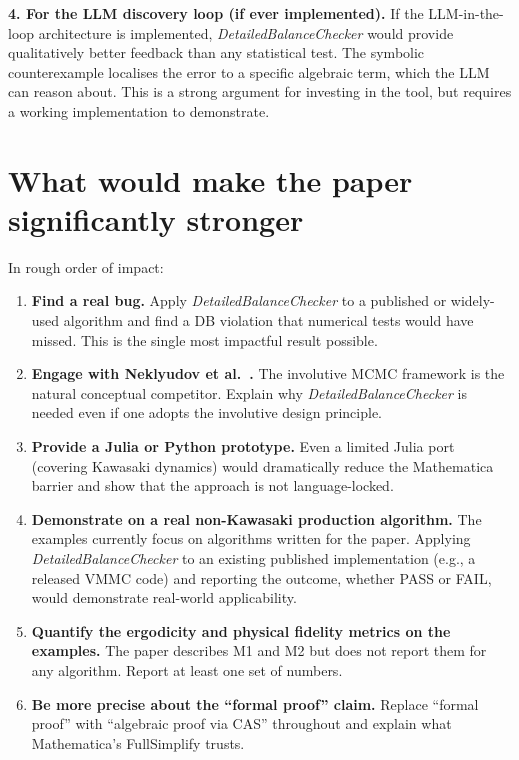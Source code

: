 \documentclass[11pt,a4paper]{article}
\newcommand{\DBC}{\textit{DetailedBalanceChecker}}
\begin{document}
\textbf{4. For the LLM discovery loop (if ever implemented).}  If the LLM-in-the-loop
architecture is implemented, \DBC{} would provide qualitatively better feedback than
any statistical test.  The symbolic counterexample localises the error to a specific
algebraic term, which the LLM can reason about.  This is a strong argument for
investing in the tool, but requires a working implementation to demonstrate.

\section{What would make the paper significantly stronger}
\label{sec:improvements}

In rough order of impact:

\begin{enumerate}[nosep]
  \item \textbf{Find a real bug.}  Apply \DBC{} to a published or widely-used
    algorithm and find a DB violation that numerical tests would have missed.
    This is the single most impactful result possible.

  \item \textbf{Engage with Neklyudov et al.~\cite{Neklyudov2020}.}  The involutive
    MCMC framework is the natural conceptual competitor.  Explain why \DBC{} is
    needed even if one adopts the involutive design principle.

  \item \textbf{Provide a Julia or Python prototype.}  Even a limited Julia port
    (covering Kawasaki dynamics) would dramatically reduce the Mathematica barrier
    and show that the approach is not language-locked.

  \item \textbf{Demonstrate on a real non-Kawasaki production algorithm.}  The
    examples currently focus on algorithms written for the paper.  Applying \DBC{}
    to an existing published implementation (e.g., a released VMMC code) and
    reporting the outcome, whether PASS or FAIL, would demonstrate real-world
    applicability.

  \item \textbf{Quantify the ergodicity and physical fidelity metrics on the examples.}
    The paper describes M1 and M2 but does not report them for any algorithm.
    Report at least one set of numbers.

  \item \textbf{Be more precise about the ``formal proof'' claim.}  Replace ``formal
    proof'' with ``algebraic proof via CAS'' throughout and explain what Mathematica's
    FullSimplify trusts.
\end{enumerate}
\end{document}
